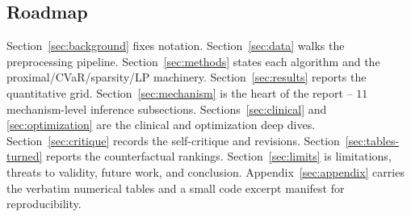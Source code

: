 \subsection{Roadmap}
Section~\ref{sec:background} fixes notation. Section~\ref{sec:data} walks the
preprocessing pipeline. Section~\ref{sec:methods} states each algorithm and the
proximal/CVaR/sparsity/LP machinery. Section~\ref{sec:results} reports the
quantitative grid. Section~\ref{sec:mechanism} is the heart of the report --
$11$ mechanism-level inference subsections. Sections~\ref{sec:clinical} and
\ref{sec:optimization} are the clinical and optimization deep dives.
Section~\ref{sec:critique} records the self-critique and revisions.
Section~\ref{sec:tables-turned} reports the counterfactual rankings. Section~\ref{sec:limits}
is limitations, threats to validity, future work, and conclusion.
Appendix~\ref{sec:appendix} carries the verbatim numerical tables and a small
code excerpt manifest for reproducibility.
